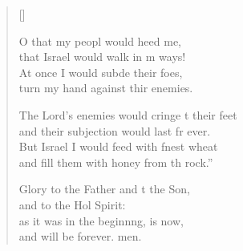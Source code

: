 \begin{verse}[\versewidth]
\begin{patverse}
O that my peopl would heed me,\Med\\
that Israel would walk in m ways!\\
At once I would subde their foes,\Med\\
turn my hand against thir enemies.

The Lord’s enemies would cringe t their feet\Med\\
and their subjection would last fr ever.\\
But Israel I would feed with f\pointup{\i}nest wheat\Med\\
and fill them with honey from th rock.”

Glory to the Father and t the Son,\Med\\
and to the Hol Spirit:\\
as it was in the beginn\pointup{\i}ng, is now,\Med\\
and will be forever. men. 
  \end{patverse}
\end{verse}
